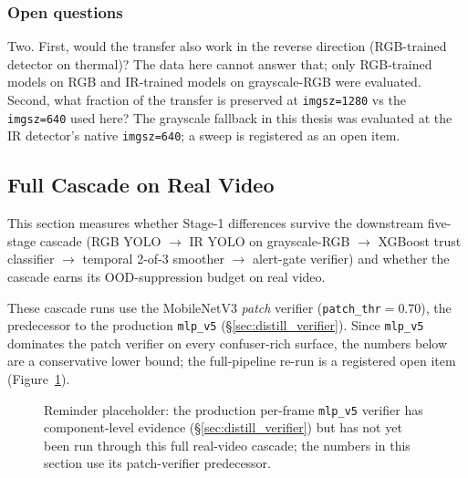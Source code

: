 \subsubsection{Open questions}

Two. First, would the transfer also work in the reverse direction (RGB-trained detector on thermal)? The data here cannot answer that; only RGB-trained models on RGB and IR-trained models on grayscale-RGB were evaluated. Second, what fraction of the transfer is preserved at \texttt{imgsz=1280} vs the \texttt{imgsz=640} used here? The grayscale fallback in this thesis was evaluated at the IR detector's native \texttt{imgsz=640}; a sweep is registered as an open item.

\subsection{Full Cascade on Real Video}
\label{sec:realvideo_cascade}

This section measures whether Stage-1 differences survive the downstream five-stage cascade (RGB YOLO $\to$ IR YOLO on grayscale-RGB $\to$ XGBoost trust classifier $\to$ temporal 2-of-3 smoother $\to$ alert-gate verifier) and whether the cascade earns its OOD-suppression budget on real video.

These cascade runs use the MobileNetV3 \emph{patch} verifier (\texttt{patch\_thr}$=$0.70), the predecessor to the production \texttt{mlp\_v5} (\S\ref{sec:distill_verifier}). Since \texttt{mlp\_v5} dominates the patch verifier on every confuser-rich surface, the numbers below are a conservative lower bound; the full-pipeline re-run is a registered open item (Figure~\ref{fig:mlp_pipeline_placeholder}).

\begin{figure}[htbp]
    \centering
    \caption{Reminder placeholder: the production per-frame \texttt{mlp\_v5} verifier has component-level evidence (\S\ref{sec:distill_verifier}) but has not yet been run through this full real-video cascade; the numbers in this section use its patch-verifier predecessor.}
    \label{fig:mlp_pipeline_placeholder}
\end{figure}

